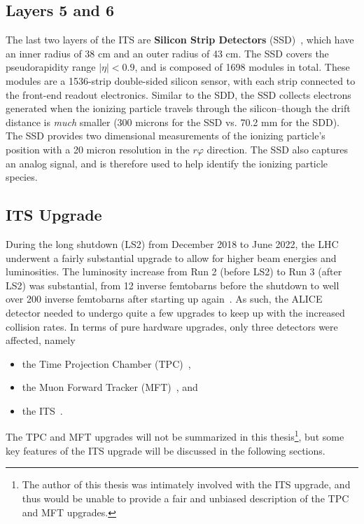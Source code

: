 \subsection{Layers 5 and 6}
The last two layers of the ITS are \textbf{Silicon Strip Detectors} (SSD)~\cite{ITSSSD}, which have an inner radius of 38 cm and an outer radius of 43 cm. The SSD covers the pseudorapidity range $|\eta| < 0.9$, and is composed of 1698 modules in total. These modules are a 1536-strip double-sided silicon sensor, with each strip connected to the front-end readout electronics. Similar to the SDD, the SSD collects electrons generated when the ionizing particle travels through the silicon--though the drift distance is \textit{much} smaller (300 microns for the SSD vs. 70.2 mm for the SDD). The SSD provides two dimensional measurements of the ionizing particle's position with a 20 micron resolution in the $r\varphi$ direction. The SSD also captures an analog signal, and is therefore used to help identify the ionizing particle species.


\subsection{ITS Upgrade}
During the long shutdown (LS2) from December 2018 to June 2022, the LHC underwent a fairly substantial upgrade to allow for higher beam energies and luminosities. The luminosity increase from Run 2 (before LS2) to Run 3 (after LS2) was substantial, from 12 inverse femtobarns before the shutdown to well over 200 inverse femtobarns after starting up again~\cite{LHCUpgrade}. As such, the ALICE detector needed to undergo quite a few upgrades to keep up with the increased collision rates. In terms of pure hardware upgrades, only three detectors were affected, namely
\begin{itemize}
    \item the Time Projection Chamber (TPC)~\cite{TPCUpgrade},
    \item the Muon Forward Tracker (MFT)~\cite{MFTUpgrade}, and
    \item the ITS~\cite{ITSUpgrade}.
\end{itemize}
The TPC and MFT upgrades will not be summarized in this thesis\footnote{The author of this thesis was intimately involved with the ITS upgrade, and thus would be unable to provide a fair and unbiased description of the TPC and MFT upgrades.}, but some key features of the ITS upgrade will be discussed in the following sections.

